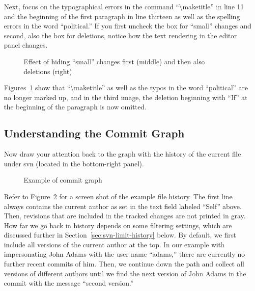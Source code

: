 Next, focus on the typographical errors in the command ``\textbackslash maketitle'' in line 11 and the beginning of the first paragraph in line thirteen as well as the spelling errors in the word ``political.''  If you first uncheck the box for ``small'' changes and second, also the box for deletions, notice how the text rendering in the editor panel changes.
\begin{figure}[t]
  \centering
  \hspace{2em}
  \hspace{2em}
\caption[Effect of hiding ``small'' changes and deletions]{Effect of hiding ``small'' changes first (middle) and then also deletions (right)} \label{fig:svn-editor-filter-small}
\end{figure}
Figures~\ref{fig:svn-editor-filter-small} show that ``\textbackslash maketitle'' as well as the typos in the word ``political'' are no longer marked up, and in the third image, the deletion beginning with ``If'' at the beginning of the paragraph is now omitted.

\subsection{Understanding the Commit Graph}

Now draw your attention back to the graph with the history of the current file under svn (located in the bottom-right panel). \begin{figure}[t]
\centering
{}
\caption{Example of commit graph} \label{fig:svn-commit-graph}
\end{figure}
Refer to Figure~\ref{fig:svn-commit-graph} for a screen shot of the example file history. The first line always contains the current author as set in the text field labeled ``Self'' above.  Then, revisions that are included in the tracked changes are not printed in gray.  How far we go back in history depends on some filtering settings, which are discussed further in Section~\ref{sec:svn-limit-history} below.  By default, we first include all versions of the current author at the top.  In our example with impersonating John Adams with the user name ``adams,'' there are currently no further recent commits of him.  Then, we continue down the path and collect all versions of different authors until we find the next version of John Adams in the commit with the message ``second version.''

